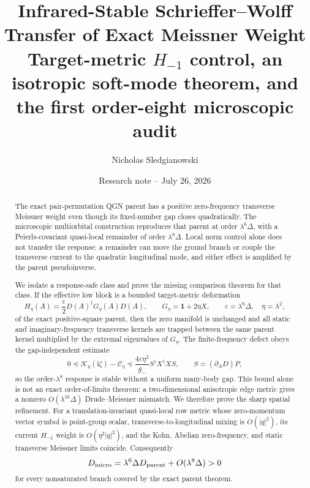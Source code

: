 \documentclass[11pt]{article}
\title{\textbf{Infrared-Stable Schrieffer--Wolff Transfer of Exact Meissner Weight}\\[0.35em]
\large Target-metric $H_{-1}$ control, an isotropic soft-mode theorem, and the first order-eight microscopic audit}
\author{Nicholas Sledgianowski}
\date{Research note -- July 26, 2026}
\theoremstyle{definition}
\theoremstyle{remark}
\newcommand{\cK}{\mathcal K}
\newcommand{\cC}{\mathcal C}
\newcommand{\Id}{\mathbf 1}
\newcommand{\I}{\mathrm i}
\newcommand{\eps}{\varepsilon}
\begin{document}
\maketitle

\begin{abstract}
The exact pair-permutation QGN parent has a positive zero-frequency transverse
Meissner weight even though its fixed-number gap closes quadratically.  The
microscopic multiorbital construction reproduces that parent at order
$\lambda^6\Delta$, with a Peierls-covariant quasi-local remainder of order
$\lambda^8\Delta$.  Local norm control alone does not transfer the response:
a remainder can move the ground branch or couple the transverse current to the
quadratic longitudinal mode, and either effect is amplified by the parent
pseudoinverse.

We isolate a response-safe class and prove the missing comparison theorem for
that class.  If the effective low block is a bounded target-metric deformation
\[
 H_{\eta}(A)=\frac{\eps}{2}D(A)^\dagger
 G_{\eta}(A)D(A),\qquad
 G_{\eta}=\Id+2\eta X,\qquad
 \eps=\lambda^6\Delta,\quad\eta=\lambda^2,
\]
of the exact positive-square parent, then the zero manifold is unchanged and
all static and imaginary-frequency transverse kernels are trapped between the
same parent kernel multiplied by the extremal eigenvalues of $G_\eta$.  The
finite-frequency defect obeys the gap-independent estimate
\[
 0\preceq \cK_\eta(\I\zeta)-\cC_\eta
 \preceq \frac{4\eps\eta^2}{g_-}
 S^\dagger X^\dagger X S,
 \qquad S=(\partial_A D)P,
\]
so the order-$\lambda^8$ response is stable without a uniform many-body gap.
This bound alone is not an exact order-of-limits theorem: a two-dimensional
anisotropic edge metric gives a nonzero $O(\lambda^{10}\Delta)$
Drude--Meissner mismatch.  We therefore prove the sharp spatial refinement.
For a translation-invariant quasi-local row metric whose zero-momentum vector
symbol is point-group scalar, transverse-to-longitudinal mixing is
$O(|q|^2)$, its current $H_{-1}$ weight is $O(\eta^2|q|^2)$, and the Kohn,
Abelian zero-frequency, and static transverse Meissner limits coincide.
Consequently
\[
 D_{\rm micro}=\lambda^6\Delta D_{\rm parent}
 +O(\lambda^8\Delta)>0
\]
for every nonsaturated branch covered by the exact parent theorem.


\end{abstract}
\end{document}

